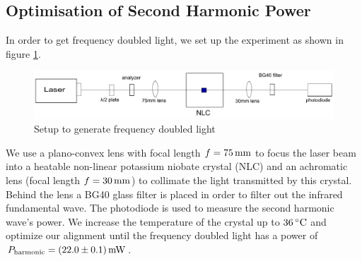 \documentclass{protokoll_en}
\begin{document}
\subsection{Optimisation of Second Harmonic Power}
\label{subsec:ana_2nd_harmonic}
In order to get frequency doubled light, we set up the experiment as shown in figure \ref{fig:setup_2ndharmonic}.
\begin{figure}[H]
  \centering
  \includegraphics[width=1.0\textwidth]{graphics/setup_2ndharmonic}
  \caption{Setup to generate frequency doubled light}
  \label{fig:setup_2ndharmonic}
\end{figure}
We use a plano-convex lens with focal length $f = \unit[75]{mm}$ to focus the laser beam into a heatable non-linear potassium niobate crystal (NLC) and an achromatic lens (focal length $f=\unit[30]{mm}$) to collimate the light transmitted by this crystal. Behind the lens a BG40 glass filter is placed in order to filter out the infrared fundamental wave. The photodiode is used to measure the second harmonic wave's power. We increase the temperature of the crystal up to $\unit[36]{^\circ C}$ and optimize our alignment until the frequency doubled light has a power of $P_\textrm{harmonic} = \unit[(22.0 \pm 0.1)]{mW}$.
\end{document}
